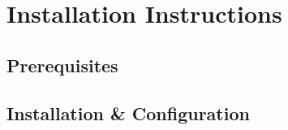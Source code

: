 \chapter{Installation Instructions}


\section*{Prerequisites}

\section*{Installation & Configuration}

